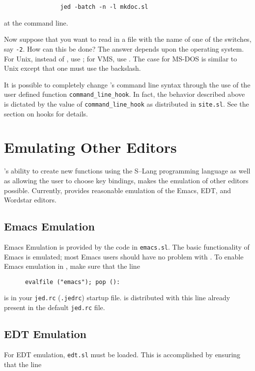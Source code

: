 \begin{verbatim}
                jed -batch -n -l mkdoc.sl
\end{verbatim}

  at the command line.

  Now suppose that you want to read in a file with the name of one of the
  switches, say \verb|-2|.  How can this be done?  The answer depends upon
  the operating system.  For Unix, instead of , use 
  ; for VMS, use .
  The case for MS-DOS is similar to Unix except that one must use the
  backslash.

  It is possible to completely change \jed{}'s command line syntax through the
  use of the user defined function \verb|command_line_hook|. In fact, the
  behavior described above is dictated by the value of
  \verb|command_line_hook| as distributed in \verb|site.sl|.  See the
  section on hooks for details.

\section{Emulating Other Editors}

  \jed{}'s ability to create new functions using the S--Lang programming
  language as well as allowing the user to choose key bindings, makes the
  emulation of other editors possible.  Currently, \jed{} provides reasonable
  emulation of the Emacs, EDT, and Wordstar editors.

\subsection{Emacs Emulation}

  Emacs Emulation is provided by the \slang{} code in \verb|emacs.sl|. The
  basic functionality of Emacs is emulated; most Emacs users should have no
  problem with \jed{}.  To enable Emacs emulation in \jed{}, make sure that the
  line
\begin{verbatim}
      evalfile ("emacs"); pop ():
\end{verbatim}
  is in your \verb|jed.rc| (\verb|.jedrc|) startup file.  \jed{} is distributed
  with this line already present in the default \verb|jed.rc| file.

\subsection{EDT Emulation}

  For EDT emulation, \verb|edt.sl| must be loaded.  This is accomplished by
  ensuring that the line

